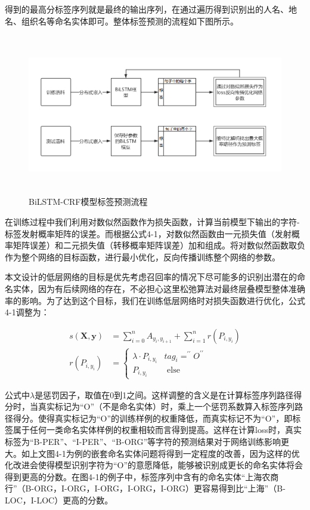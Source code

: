 \documentclass[winfonts,master,oneside,nobackinfo]{njuthesis}
\begin{document}
得到的最高分标签序列就是最终的输出序列，在通过遍历得到识别出的人名、地名、组织名等命名实体即可。整体标签预测的流程如下图所示。

\begin{figure}[H]
\centering
\begin{minipage}[t]{\textwidth}
\includegraphics[width=1\textwidth,height=7cm]{./figure/标签预测流程.jpg}
\caption{BiLSTM-CRF模型标签预测流程}
\label{lab:1}
\end{minipage}
\end{figure}

在训练过程中我们利用对数似然函数作为损失函数，计算当前模型下输出的字符-标签发射概率矩阵的误差。而根据公式4-1，对数似然函数由一元损失值（发射概率矩阵误差）和二元损失值（转移概率矩阵误差）加和组成。将对数似然函数取负作为整个网络的目标函数，进行最小优化，反向传播训练整个网络的参数。

本文设计的低层网络的目标是优先考虑召回率的情况下尽可能多的识别出潜在的命名实体，因为有后续网络的存在，不必担心这里松弛算法对最终层叠模型整体准确率的影响。为了达到这个目标，我们在训练低层网络时对损失函数进行优化，公式4-1调整为：

\begin{equation} 
\begin{split}
s(\bm{X}, \bm{y})&=\sum_{i=0}^{n} A_{y_{i}, y_{i+1}}+\sum_{i=1}^{n} r(P_{i, y_{i}}) \\ 
r\left(P_{i, y_{i}}\right)&=\left\{\begin{array}{ll}{\lambda \cdot P_{i, y_{i}}} & {t a g_{i}=^{\prime \prime} O^{\prime \prime}} \\ {P_{i, y_{i}}} & {\text { else }}\end{array}\right.
\end{split}
\end{equation}

公式中$\lambda$是惩罚因子，取值在0到1之间。这样调整的含义是在计算标签序列路径得分时，当真实标记为“O”（不是命名实体）时，乘上一个惩罚系数算入标签序列路径得分。使得真实标记为“O”的训练样例的权重降低，而真实标记不为“O”，即标签属于任何一类命名实体样例的权重相较而言得到提高。这样在计算loss时，真实标签为“B-PER”、“I-PER”、“B-ORG”等字符的预测结果对于网络训练影响更大。如上文图4-1为例的嵌套命名实体问题将得到一定程度的改善，因为这样的优化改进会使得模型识别字符为“O”的意愿降低，能够被识别成更长的命名实体将会得到更高的分数。在图4-1的例子中，标签序列中含有的命名实体“上海农商行”（B-ORG，I-ORG，I-ORG，I-ORG，I-ORG）更容易得到比“上海”（B-LOC，I-LOC）更高的分数。
\end{document}
